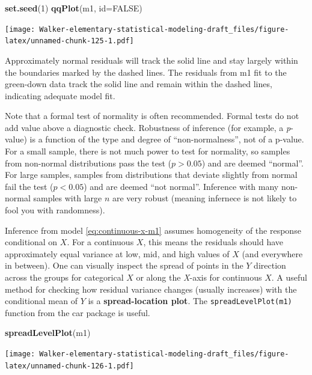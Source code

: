 \documentclass[]{book}
\newenvironment{Shaded}{\begin{snugshade}}{\end{snugshade}}
\newcommand{\DataTypeTok}[1]{\textcolor[rgb]{0.13,0.29,0.53}{#1}}
\newcommand{\DecValTok}[1]{\textcolor[rgb]{0.00,0.00,0.81}{#1}}
\newcommand{\KeywordTok}[1]{\textcolor[rgb]{0.13,0.29,0.53}{\textbf{#1}}}
\newcommand{\NormalTok}[1]{#1}
\newcommand{\OtherTok}[1]{\textcolor[rgb]{0.56,0.35,0.01}{#1}}
\begin{document}
\begin{Shaded}
\begin{Highlighting}[]
\KeywordTok{set.seed}\NormalTok{(}\DecValTok{1}\NormalTok{)}
\KeywordTok{qqPlot}\NormalTok{(m1, }\DataTypeTok{id=}\OtherTok{FALSE}\NormalTok{)}
\end{Highlighting}
\end{Shaded}

\texttt{[image: Walker-elementary-statistical-modeling-draft\_files/figure-latex/unnamed-chunk-125-1.pdf]}

Approximately normal residuals will track the solid line and stay largely within the boundaries marked by the dashed lines. The residuals from m1 fit to the green-down data track the solid line and remain within the dashed lines, indicating adequate model fit.

Note that a formal test of normality is often recommended. Formal tests do not add value above a diagnostic check. Robustness of inference (for example, a \emph{p}-value) is a function of the type and degree of ``non-normalness'', not of a p-value. For a small sample, there is not much power to test for normality, so samples from non-normal distributions pass the test (\(p > 0.05\)) and are deemed ``normal''. For large samples, samples from distributions that deviate slightly from normal fail the test (\(p < 0.05\)) and are deemed ``not normal''. Inference with many non-normal samples with large \(n\) are very robust (meaning infernece is not likely to fool you with randomness).

Inference from model \eqref{eq:continuous-x-m1} assumes homogeneity of the response conditional on \(X\). For a continuous \(X\), this means the residuals should have approximately equal variance at low, mid, and high values of \(X\) (and everywhere in between). One can visually inspect the spread of points in the \(Y\) direction across the groups for categorical \(X\) or along the \emph{X}-axis for continuous \(X\). A useful method for checking how residual variance changes (usually increases) with the conditional mean of \(Y\) is a \textbf{spread-location plot}. The \texttt{spreadLevelPlot(m1)} function from the car package is useful.

\begin{Shaded}
\begin{Highlighting}[]
\KeywordTok{spreadLevelPlot}\NormalTok{(m1)}
\end{Highlighting}
\end{Shaded}

\texttt{[image: Walker-elementary-statistical-modeling-draft\_files/figure-latex/unnamed-chunk-126-1.pdf]}
\end{document}
